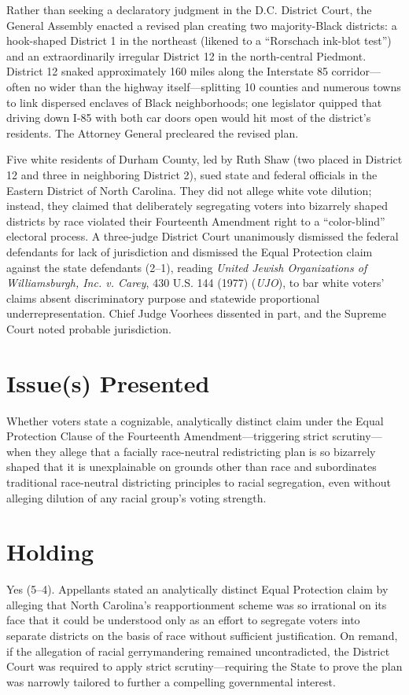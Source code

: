 \documentclass[12pt]{article}
\begin{document}
Rather than seeking a declaratory judgment in the D.C. District Court, the General Assembly enacted a revised plan creating two majority-Black districts: a hook-shaped District 1 in the northeast (likened to a ``Rorschach ink-blot test'') and an extraordinarily irregular District 12 in the north-central Piedmont. District 12 snaked approximately 160 miles along the Interstate 85 corridor---often no wider than the highway itself---splitting 10 counties and numerous towns to link dispersed enclaves of Black neighborhoods; one legislator quipped that driving down I-85 with both car doors open would hit most of the district's residents. The Attorney General precleared the revised plan.

Five white residents of Durham County, led by Ruth Shaw (two placed in District 12 and three in neighboring District 2), sued state and federal officials in the Eastern District of North Carolina. They did not allege white vote dilution; instead, they claimed that deliberately segregating voters into bizarrely shaped districts by race violated their Fourteenth Amendment right to a ``color-blind'' electoral process. A three-judge District Court unanimously dismissed the federal defendants for lack of jurisdiction and dismissed the Equal Protection claim against the state defendants (2--1), reading \textit{United Jewish Organizations of Williamsburgh, Inc. v. Carey}, 430 U.S. 144 (1977) (\textit{UJO}), to bar white voters' claims absent discriminatory purpose and statewide proportional underrepresentation. Chief Judge Voorhees dissented in part, and the Supreme Court noted probable jurisdiction.

\section{Issue(s) Presented}
Whether voters state a cognizable, analytically distinct claim under the Equal Protection Clause of the Fourteenth Amendment---triggering strict scrutiny---when they allege that a facially race-neutral redistricting plan is so bizarrely shaped that it is unexplainable on grounds other than race and subordinates traditional race-neutral districting principles to racial segregation, even without alleging dilution of any racial group's voting strength.

\section{Holding}
Yes (5--4). Appellants stated an analytically distinct Equal Protection claim by alleging that North Carolina's reapportionment scheme was so irrational on its face that it could be understood only as an effort to segregate voters into separate districts on the basis of race without sufficient justification. On remand, if the allegation of racial gerrymandering remained uncontradicted, the District Court was required to apply strict scrutiny---requiring the State to prove the plan was narrowly tailored to further a compelling governmental interest.
\end{document}

